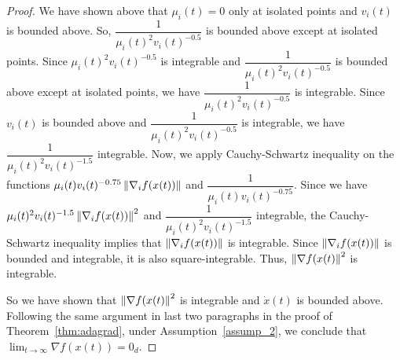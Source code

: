 \begin{proof}
We have shown above that $\mu_i(t) = 0$ only at isolated points and $v_i(t)$ is bounded above. So, $\dfrac{1}{\mu_i(t)^2 v_i(t)^{-0.5}}$ is bounded above except at isolated points.
Since $\mu_i(t)^2 v_i(t)^{-0.5}$ is integrable and $\dfrac{1}{\mu_i(t)^2 v_i(t)^{-0.5}}$ is bounded above except at isolated points, we have $\dfrac{1}{\mu_i(t)^2 v_i(t)^{-0.5}}$ is integrable. Since $v_i(t)$ is bounded above and $\dfrac{1}{\mu_i(t)^2 v_i(t)^{-0.5}}$ is integrable, we have $\dfrac{1}{\mu_i(t)^2 v_i(t)^{-1.5}}$ integrable.
Now, we apply Cauchy-Schwartz inequality on the functions $\mu_i(t) v_i(t)^{-0.75} \left\lVert\nabla_i f(x(t))\right\rVert $ and $\dfrac{1}{\mu_i(t) v_i(t)^{-0.75}}$. Since we have $\mu_i(t)^2 v_i(t)^{-1.5} \left\lVert\nabla_i f(x(t))\right\rVert ^2$ and $\dfrac{1}{\mu_i(t)^2 v_i(t)^{-1.5}}$ integrable, the Cauchy-Schwartz inequality implies that $\left\lVert\nabla_i f(x(t))\right\rVert $ is integrable. Since $\left\lVert\nabla_i f(x(t))\right\rVert $ is bounded and integrable, it is also square-integrable. Thus, $\left\lVert\nabla f(x(t)\right\rVert ^2$ is integrable.

So we have shown that $\left\lVert\nabla f(x(t)\right\rVert ^2$ is integrable and $\Dot{x}(t)$ is bounded above.
Following the same argument in last two paragraphs in the proof of Theorem~\ref{thm:adagrad}, under Assumption~\ref{assump_2}, we conclude that $\lim_{t \to \infty} \nabla f(x(t)) = 0_d$.
\end{proof}



























